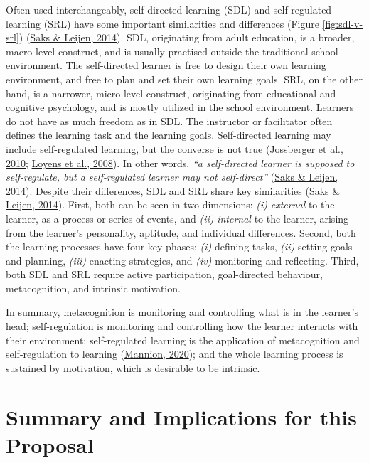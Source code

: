 \documentclass[letterpaper, nobind]{templates/ociamthesis}
\begin{document}
Often used interchangeably, self-directed learning (SDL) and
self-regulated learning (SRL) have some important similarities and
differences (Figure \ref{fig:sdl-v-srl}) (\protect\hyperlink{ref-saks2014distinguishing}{Saks \& Leijen, 2014}). SDL, originating
from adult education, is a broader, macro-level construct, and is
usually practised outside the traditional school environment. The
self-directed learner is free to design their own learning environment,
and free to plan and set their own learning goals. SRL, on the other
hand, is a narrower, micro-level construct, originating from educational
and cognitive psychology, and is mostly utilized in the school
environment. Learners do not have as much freedom as in SDL. The
instructor or facilitator often defines the learning task and the
learning goals. Self-directed learning may include self-regulated
learning, but the converse is not true
(\protect\hyperlink{ref-jossberger2010challenge}{Jossberger et al., 2010}; \protect\hyperlink{ref-loyens2008selfdirected}{Loyens et al., 2008}). In other words, \emph{``a self-directed learner is supposed to self-regulate, but a self-regulated learner may not self-direct''} (\protect\hyperlink{ref-saks2014distinguishing}{Saks \& Leijen, 2014}). Despite their
differences, SDL and SRL share key similarities
(\protect\hyperlink{ref-saks2014distinguishing}{Saks \& Leijen, 2014}).
First, both can be seen in two dimensions:
\emph{(i)} \emph{external} to the learner, as a process or series of events, and
\emph{(ii)} \emph{internal} to the learner, arising from the learner's personality, aptitude, and individual differences.
Second, both the
learning processes have four key phases:
\emph{(i)} defining tasks,
\emph{(ii)} setting goals and planning,
\emph{(iii)} enacting strategies, and
\emph{(iv)} monitoring and reflecting.
Third, both SDL and SRL require active
participation, goal-directed behaviour, metacognition, and intrinsic
motivation.

In summary, metacognition is monitoring and controlling what is in the
learner's head; self-regulation is monitoring and controlling how the
learner interacts with their environment; self-regulated learning is the
application of metacognition and self-regulation to learning
(\protect\hyperlink{ref-mannion2020metacognition}{Mannion, 2020}); and the whole learning process is sustained
by motivation, which is desirable to be intrinsic.

\hypertarget{sec-bg-learn-summary}{%
\section{Summary and Implications for this Proposal}\label{sec-bg-learn-summary}}
\end{document}
